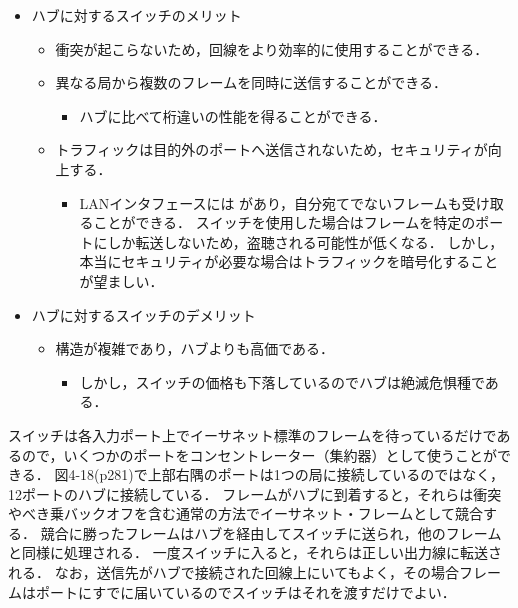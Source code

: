 \documentclass[a4paper]{ltjsarticle}
\begin{document}
\begin{itemize}
\item
  ハブに対するスイッチのメリット

  \begin{itemize}

  \item
    衝突が起こらないため，回線をより効率的に使用することができる．
  \item
    異なる局から複数のフレームを同時に送信することができる．

    \begin{itemize}
  
    \item
      ハブに比べて桁違いの性能を得ることができる．
    \end{itemize}
  \item
    トラフィックは目的外のポートへ送信されないため，セキュリティが向上する．

    \begin{itemize}
  
    \item
      LANインタフェースには  があり，自分宛てでないフレームも受け取ることができる．
      スイッチを使用した場合はフレームを特定のポートにしか転送しないため，盗聴される可能性が低くなる．
      しかし，本当にセキュリティが必要な場合はトラフィックを暗号化することが望ましい．
    \end{itemize}
  \end{itemize}
\item
  ハブに対するスイッチのデメリット

  \begin{itemize}

  \item
    構造が複雑であり，ハブよりも高価である．

    \begin{itemize}
  
    \item
      しかし，スイッチの価格も下落しているのでハブは絶滅危惧種である．
    \end{itemize}
  \end{itemize}
\end{itemize}

スイッチは各入力ポート上でイーサネット標準のフレームを待っているだけであるので，いくつかのポートをコンセントレーター（集約器）として使うことができる．
図4-18(p281)で上部右隅のポートは1つの局に接続しているのではなく，12ポートのハブに接続している．
フレームがハブに到着すると，それらは衝突やべき乗バックオフを含む通常の方法でイーサネット・フレームとして競合する．
競合に勝ったフレームはハブを経由してスイッチに送られ，他のフレームと同様に処理される．
一度スイッチに入ると，それらは正しい出力線に転送される．
なお，送信先がハブで接続された回線上にいてもよく，その場合フレームはポートにすでに届いているのでスイッチはそれを渡すだけでよい．
\end{document}
